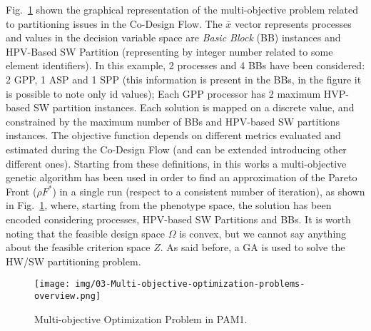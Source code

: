 Fig.~\ref{figMOGAOverview} shown the graphical representation of the multi-objective problem related to partitioning issues in the Co-Design Flow. 
The $\bar x$ vector represents processes and values in the decision variable space are \textit{Basic Block} (BB) instances and HPV-Based SW Partition (representing by integer number related to some element identifiers). 
In this example, 2 processes and 4 BBs have been considered: 2 GPP, 1 ASP and 1 SPP (this information is present in the BBs, in the figure it is possible to note only id values); Each GPP processor has 2 maximum HVP-based SW partition instances. Each solution is mapped on a discrete value, and constrained by the maximum number of BBs and HPV-based SW partitions instances.
The objective function depends on different metrics evaluated and estimated during the Co-Design Flow (and can be extended introducing other different ones). Starting from these definitions, in this works a multi-objective genetic algorithm has been used in order to find an approximation of the Pareto Front ($\rho F^\ast$) in a single run (respect to a consistent number of iteration), as shown in Fig.~\ref{figMOGAOverview}, where, starting from the phenotype space, the solution has been encoded considering processes, HPV-based SW Partitions and BBs.
It is worth noting that the feasible design space $\Omega$ is convex, but we cannot say anything about the feasible criterion space $Z$. As said before, a GA is used  to solve the HW/SW partitioning problem.
%
\begin{figure}[htbp]
	\centerline{\texttt{[image: img/03-Multi-objective-optimization-problems-overview.png]}}
	\caption{Multi-objective Optimization Problem in PAM1.}
	\label{figMOGAOverview}
\end{figure}
%
%
%
%


